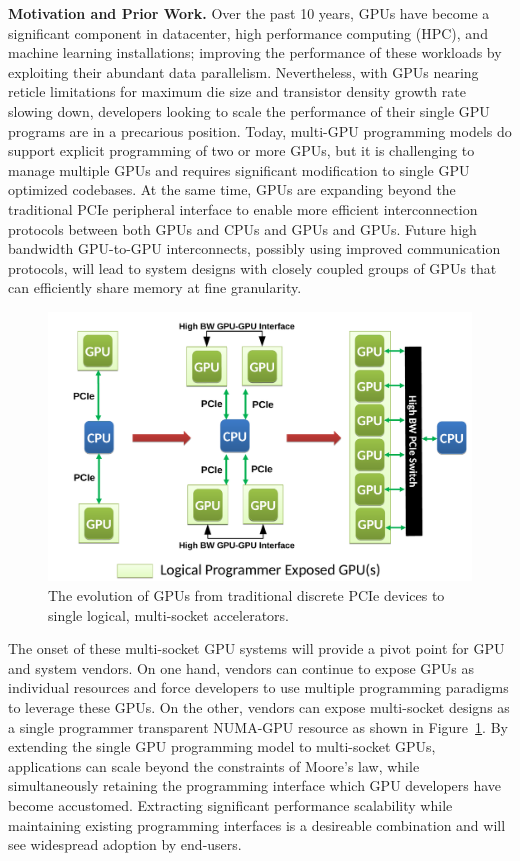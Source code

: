 \documentclass{sig-alternate}
\begin{document}
\textbf{Motivation and Prior Work.} Over the past 10 years, GPUs have become a 
significant component in datacenter, high performance computing (HPC), and 
machine learning installations; improving the performance of these workloads by 
exploiting their abundant data parallelism. Nevertheless, with GPUs nearing
reticle limitations for maximum die size and transistor density growth rate 
slowing down, developers looking to scale the performance of their single GPU 
programs are in a precarious position. Today, multi-GPU programming models do 
support explicit programming of two or more GPUs, but it is challenging to 
manage multiple GPUs and requires significant modification to single 
GPU optimized codebases.  At the same time, GPUs are expanding beyond the traditional 
PCIe peripheral interface to enable more efficient interconnection protocols 
between both GPUs and CPUs and GPUs and GPUs. Future high bandwidth GPU-to-GPU interconnects, 
possibly using improved communication protocols, will lead to system designs 
with closely coupled groups of GPUs that can efficiently share memory at fine 
granularity.

\begin{figure}[t]
	\centering
	\includegraphics[width=1.0\columnwidth]{figures/inter_gpu_connections.pdf}
	\caption{The evolution of GPUs from traditional discrete PCIe devices to 
		single logical, multi-socket accelerators.}
	\vspace{-0.25in}
	\label{fig:systemdiagram}
\end{figure}

The onset of these multi-socket GPU systems will provide a pivot point for GPU 
and system vendors. On one hand, vendors can continue to expose GPUs as 
individual resources and force developers to use multiple programming paradigms 
to leverage these GPUs. On the other, vendors can expose multi-socket designs as 
a single programmer transparent NUMA-GPU resource as shown in 
Figure~\ref{fig:systemdiagram}.  By extending the single GPU programming model 
to multi-socket GPUs, applications can scale beyond the constraints of Moore's 
law, while simultaneously retaining the programming interface which GPU 
developers have become accustomed.  Extracting significant performance 
scalability while maintaining existing programming interfaces is a desireable 
combination and will see widespread adoption by end-users.
\end{document}
